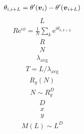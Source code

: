\documentclass[43pt]{jsarticle}
\def\vector#1{\mbox{\boldmath \(#1\)}}
\begin{document}
\begin{eqnarray*}
  \theta_{i, i + L} = \theta'(\vector{v}_{i}) - \theta'(\vector{v}_{i + L})
\end{eqnarray*}
\newpage
\begin{eqnarray*}
  L
\end{eqnarray*}
\newpage
\begin{eqnarray*}
  R \mathrm{e}^{i \phi} = \frac{1}{N}\sum_{k} \mathrm{e}^{i \theta_{k, k+L}}
\end{eqnarray*}
\newpage
\begin{eqnarray*}
  R
\end{eqnarray*}
\newpage
\begin{eqnarray*}
  N
\end{eqnarray*}
\newpage
\begin{eqnarray*}
  \lambda_{\mathrm{avg}}
\end{eqnarray*}
\newpage
\begin{eqnarray*}
  T = L / \lambda_{\mathrm{avg}}
\end{eqnarray*}
\newpage
\begin{eqnarray*}
  R_{g}(N)
\end{eqnarray*}
\newpage
\begin{eqnarray*}
  N \sim R_{g}^{D}
\end{eqnarray*}
\newpage
\begin{eqnarray*}
  D
\end{eqnarray*}
\newpage
\begin{eqnarray*}
  x
\end{eqnarray*}
\newpage
\begin{eqnarray*}
  y
\end{eqnarray*}
\newpage
\begin{eqnarray*}
  M(L) \sim L^{D}
\end{eqnarray*}
\newpage
\end{document}
